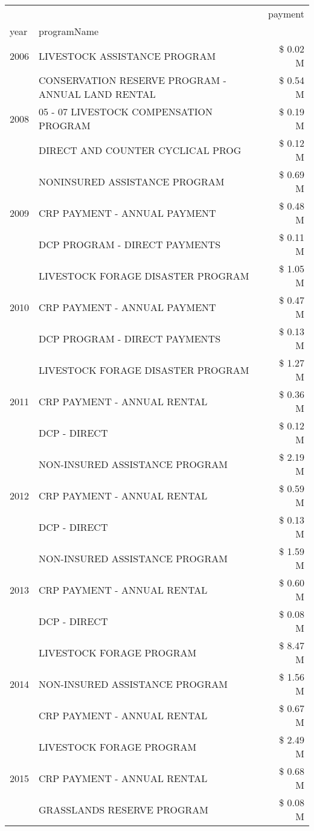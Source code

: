 \begin{tabular}{llr}
\toprule
 &  & payment \\
year & programName &  \\
\midrule
2006 & LIVESTOCK ASSISTANCE PROGRAM & \$ 0.02 M \\
\cline{1-3}
\multirow[t]{3}{*}{2008} & CONSERVATION RESERVE PROGRAM - ANNUAL LAND RENTAL & \$ 0.54 M \\
 & 05 - 07 LIVESTOCK COMPENSATION PROGRAM & \$ 0.19 M \\
 & DIRECT AND COUNTER CYCLICAL PROG & \$ 0.12 M \\
\cline{1-3}
\multirow[t]{3}{*}{2009} & NONINSURED ASSISTANCE PROGRAM & \$ 0.69 M \\
 & CRP PAYMENT - ANNUAL PAYMENT & \$ 0.48 M \\
 & DCP PROGRAM - DIRECT PAYMENTS & \$ 0.11 M \\
\cline{1-3}
\multirow[t]{3}{*}{2010} & LIVESTOCK FORAGE DISASTER  PROGRAM & \$ 1.05 M \\
 & CRP PAYMENT - ANNUAL PAYMENT & \$ 0.47 M \\
 & DCP PROGRAM - DIRECT PAYMENTS & \$ 0.13 M \\
\cline{1-3}
\multirow[t]{3}{*}{2011} & LIVESTOCK FORAGE DISASTER PROGRAM & \$ 1.27 M \\
 & CRP PAYMENT - ANNUAL RENTAL & \$ 0.36 M \\
 & DCP - DIRECT & \$ 0.12 M \\
\cline{1-3}
\multirow[t]{3}{*}{2012} & NON-INSURED ASSISTANCE PROGRAM & \$ 2.19 M \\
 & CRP PAYMENT - ANNUAL RENTAL & \$ 0.59 M \\
 & DCP - DIRECT & \$ 0.13 M \\
\cline{1-3}
\multirow[t]{3}{*}{2013} & NON-INSURED ASSISTANCE PROGRAM & \$ 1.59 M \\
 & CRP PAYMENT - ANNUAL RENTAL & \$ 0.60 M \\
 & DCP - DIRECT & \$ 0.08 M \\
\cline{1-3}
\multirow[t]{3}{*}{2014} & LIVESTOCK FORAGE PROGRAM & \$ 8.47 M \\
 & NON-INSURED ASSISTANCE PROGRAM & \$ 1.56 M \\
 & CRP PAYMENT - ANNUAL RENTAL & \$ 0.67 M \\
\cline{1-3}
\multirow[t]{3}{*}{2015} & LIVESTOCK FORAGE PROGRAM & \$ 2.49 M \\
 & CRP PAYMENT - ANNUAL RENTAL & \$ 0.68 M \\
 & GRASSLANDS RESERVE PROGRAM & \$ 0.08 M \\

\end{tabular}
